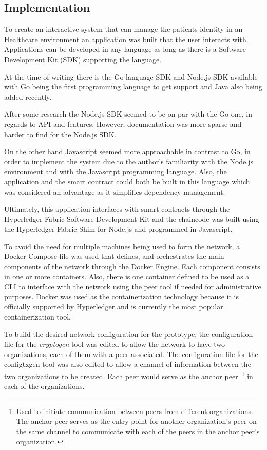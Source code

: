 \subsection{Implementation}

To create an interactive system that can manage the patients identity in an
Healthcare environment an application was built that the user interacts with.
Applications can be developed in any language as long as there is a Software
Development Kit (SDK) supporting the language. 

At the time of writing there is the Go language SDK and Node.js SDK available
with Go being the first programming language to get support and Java also being
added recently. 

After some research the Node.js SDK seemed to be on par with the Go one, in
regards to API and features. However, documentation was more sparse and harder
to find for the Node.js SDK. 

On the other hand Javascript seemed more approachable in contrast to Go, in
order to implement the system due to the author's familiarity with the Node.js
environment and with the Javascript programming language. Also, the application
and the smart contract could both be built in this language which was
considered an advantage as it simplifies dependency management. 

Ultimately, this application interfaces with smart contracts through the
Hyperledger Fabric Software Development Kit and the chaincode was built using
the Hyperledger Fabric Shim for Node.js and programmed in Javascript.

To avoid the need for multiple machines being used to form the network, a
Docker Compose file was used that defines, and orchestrates the main components
of the network through the Docker Engine. Each component consists in one or
more containers. Also, there is one  container defined to be used as a CLI to
interface with the network using the peer tool if needed for administrative
purposes. Docker was used as the containerization technology because it is
officially supported by Hyperledger and is currently the most popular
containerization tool.

To build the desired network configuration for the prototype, the configuration
file for the \textit{cryptogen} tool was edited to allow the network to have
two organizations, each of them with a peer associated. The configuration file
for the configtxgen tool was also edited to allow a channel of information
between the two organizations to be created. Each peer would serve as the
anchor peer~\footnote{Used to initiate communication between peers from
different organizations. The anchor peer serves as the entry point for another
organization’s peer on the same channel to communicate with each of the peers
in the anchor peer’s organization.} in each of the organizations.

